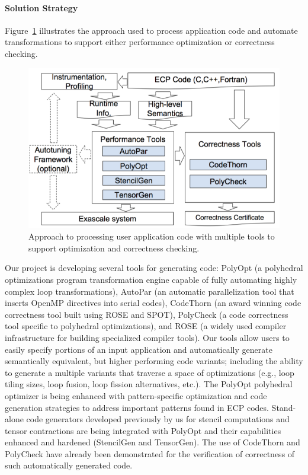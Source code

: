 \paragraph{Solution Strategy}


Figure~\ref{fig:2.3.2.05-ExascaleCodeGenToolkit} illustrates the approach used to process 
application code and automate transformations to support either performance optimization 
or correctness checking.
\begin{figure}[htb]
	\centering
	\includegraphics[width=4.5in]{projects/2.3.2-Tools/2.3.2.05-Exascale-Code-Generation-Toolkit/ExascaleCodeGenToolkit.png}
	\caption{\label{fig:2.3.2.05-ExascaleCodeGenToolkit} Approach to processing user application 
                 code with multiple tools to support optimization and correctness checking.}
\end{figure}
Our project is developing several tools for generating code: PolyOpt (a polyhedral 
optimizations program transformation engine capable of fully automating highly complex loop transformations), 
AutoPar (an automatic parallelization tool that inserts OpenMP directives into serial codes), 
CodeThorn (an award winning code correctness tool built using ROSE and SPOT),  PolyCheck (a code 
correctness tool specific to polyhedral optimizations), and ROSE (a widely used compiler infrastructure 
for building specialized compiler tools). Our tools allow users to easily specify portions of an input application and 
automatically generate semantically equivalent, but higher performing code variants; including the ability 
to generate a multiple variants that traverse a space of optimizations (e.g., loop tiling sizes, loop fusion, 
loop fission alternatives, etc.). The PolyOpt polyhedral optimizer is being enhanced with pattern-specific 
optimization and code generation strategies to address important patterns found in ECP codes. Stand-alone 
code generators developed previously by us for stencil computations and tensor contractions are being 
integrated with PolyOpt and their capabilities enhanced and hardened (StencilGen and TensorGen).  The 
use of CodeThorn and PolyCheck have already been demonstrated for the verification of correctness of 
such automatically generated code.

